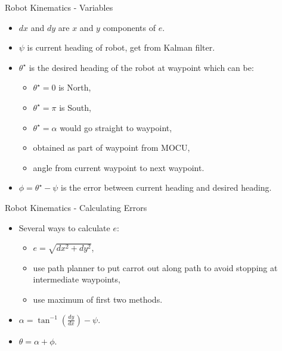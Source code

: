 \documentclass[hyperref={pdfpagelabels=false}]{beamer}
\begin{document}
\begin{frame}{Robot Kinematics - Variables}
\begin{itemize}
\item $dx$ and $dy$ are $x$ and $y$ components of $e$.
\item $\psi$ is current heading of robot, get from Kalman filter.
\item $\theta^\star$ is the desired heading of the robot at waypoint which can be:
\begin{itemize}
\item $\theta^\star=0$ is North,
\item $\theta^\star=\pi$ is South,
\item $\theta^\star=\alpha$ would go straight to waypoint,
\item obtained as part of waypoint from MOCU,
\item angle from current waypoint to next waypoint.
\end{itemize}
\item $\phi=\theta^\star-\psi$ is the error between current heading and desired heading.
\end{itemize}
\end{frame}

\begin{frame}{Robot Kinematics - Calculating Errors}
\begin{itemize}
\item Several ways to calculate $e$:
\begin{itemize}
\item $e=\sqrt{dx^2+dy^2}$,
\item use path planner to put carrot out along path to avoid stopping at intermediate waypoints,
\item use maximum of first two methods.
\end{itemize}
\item $\alpha=\tan^{-1}\left(\tfrac{dy}{dx}\right) - \psi$.
\item $\theta=\alpha+\phi$.
\end{itemize}
\end{frame}
\end{document}
